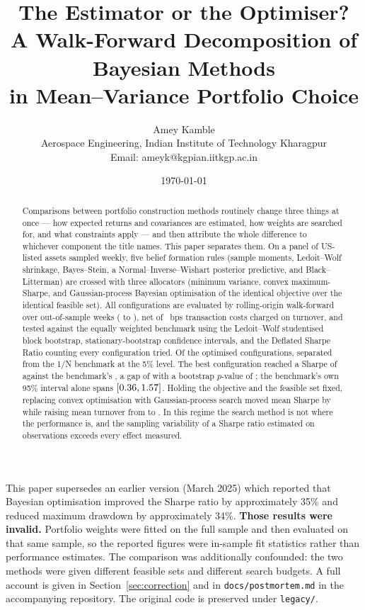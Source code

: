 \documentclass[a4paper,12pt]{article}
\title{\textbf{The Estimator or the Optimiser?\\
A Walk-Forward Decomposition of Bayesian Methods\\
in Mean--Variance Portfolio Choice}}
\author{Amey Kamble \\ Aerospace Engineering, Indian Institute of Technology Kharagpur\\
Email: ameyk@kgpian.iitkgp.ac.in}
\date{\today}
\begin{document}
\maketitle

\begin{tcolorbox}[colback=red!4!white,colframe=red!55!black,title=\textbf{Correction notice}]
This paper supersedes an earlier version (March 2025) which reported that Bayesian
optimisation improved the Sharpe ratio by approximately 35\% and reduced maximum
drawdown by approximately 34\%. \textbf{Those results were invalid.} Portfolio
weights were fitted on the full sample and then evaluated on that same sample, so
the reported figures were in-sample fit statistics rather than performance
estimates. The comparison was additionally confounded: the two methods were given
different feasible sets and different search budgets. A full account is given in
Section~\ref{sec:correction} and in \texttt{docs/postmortem.md} in the
accompanying repository. The original code is preserved under \texttt{legacy/}.
\end{tcolorbox}

\begin{abstract}
Comparisons between portfolio construction methods routinely change three things
at once --- how expected returns and covariances are estimated, how weights are
searched for, and what constraints apply --- and then attribute the whole
difference to whichever component the title names. This paper separates them. On
a panel of \nAssets{} US-listed assets sampled weekly, five belief formation rules
(sample moments, Ledoit--Wolf shrinkage, Bayes--Stein, a Normal--Inverse--Wishart
posterior predictive, and Black--Litterman) are crossed with three allocators
(minimum variance, convex maximum-Sharpe, and Gaussian-process Bayesian
optimisation of the identical objective over the identical feasible set). All
\nTrials{} configurations are evaluated by rolling-origin walk-forward over
\oosPeriods{} out-of-sample weeks (\oosStart{} to \oosEnd{}), net of \costBps{}~bps
transaction costs charged on turnover, and tested against the equally weighted
benchmark using the Ledoit--Wolf studentised block bootstrap, stationary-bootstrap
confidence intervals, and the Deflated Sharpe Ratio counting every configuration
tried. Of the \nStrategies{} optimised configurations, \nBeatingBenchmark{}
separated from the 1/N benchmark at the 5\% level. The best configuration reached
a Sharpe of \bestSharpe{} against the benchmark's \benchSharpe{}, a gap of
\bestSharpeGap{} with a bootstrap $p$-value of \bestPValue{}; the benchmark's own
95\% interval alone spans $[0.36{}, 1.57{}]$. Holding the objective
and the feasible set fixed, replacing convex optimisation with Gaussian-process
search moved mean Sharpe by \optimiserDelta{} while raising mean turnover from
\convexTurnover{} to \gpTurnover{}. In this regime the search method is not where
the performance is, and the sampling variability of a Sharpe ratio estimated on
\oosPeriods{} observations exceeds every effect measured.
\end{abstract}
\end{document}
